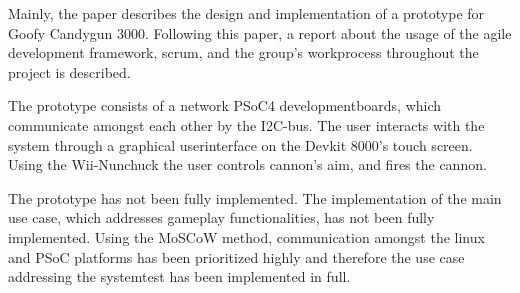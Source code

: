\noindent Mainly, the paper describes the design and implementation of a prototype for Goofy Candygun 3000. Following this paper, a report about the usage of the agile development framework, scrum, and the group's workprocess throughout the project is described. \newline 

\noindent The prototype consists of a network PSoC4 developmentboards, which communicate amongst each other by the I2C-bus. The user interacts with the system through a graphical userinterface on the Devkit 8000's touch screen. Using the Wii-Nunchuck the user controls cannon's aim, and fires the cannon. \newline

\noindent The prototype has not been fully implemented. The implementation of the main use case, which addresses gameplay functionalities, has not been fully implemented. Using the MoSCoW method, communication amongst the linux and PSoC platforms has been prioritized highly and therefore the use case addressing the systemtest has been implemented in full.\newline